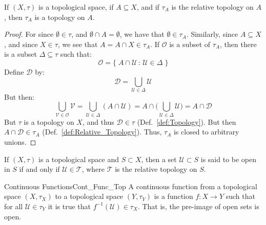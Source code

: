    \begin{theorem}
        If $(X,\tau)$ is a topological space, if $A\subseteq{X}$, and if
        $\tau_{A}$ is the relative topology on $A$, then $\tau_{A}$ is a
        topology on $A$.
    \end{theorem}
    \begin{proof}
        For since $\emptyset\in\tau$, and $\emptyset\cap{A}=\emptyset$, we have
        that $\emptyset\in\tau_{A}$. Similarly, since $A\subseteq{X}$, and
        since $X\in\tau$, we see that $A=A\cap{X}\in\tau_{A}$. If $\mathcal{O}$
        is a subset of $\tau_{A}$, then there is a subset $\Delta\subseteq\tau$
        such that:
        \begin{equation}
            \mathcal{O}=\big\{\;A\cap\mathcal{U}\,:\,\mathcal{U}\in\Delta\;\}
        \end{equation}
        Define $\mathcal{D}$ by:
        \begin{equation}
            \mathcal{D}=\bigcup_{\mathcal{U}\in\Delta}\mathcal{U}
        \end{equation}
        But then:
        \begin{equation}
            \bigcup_{\mathcal{V}\in\mathcal{O}}\mathcal{V}
            =\bigcup_{\mathcal{U}\in\Delta}(A\cap\mathcal{U})
            =A\cap\Big(\bigcup_{\mathcal{U}\in\Delta}\mathcal{U}\Big)
            =A\cap\mathcal{D}
        \end{equation}
        But $\tau$ is a topology on $X$, and thus $\mathcal{D}\in\tau$
        (Def.~\ref{def:Topology}). But then $A\cap\mathcal{D}\in\tau_{A}$
        (Def.~\ref{def:Relative_Topology}). Thus, $\tau_{A}$
        is closed to arbitrary unions.
    \end{proof}
    \begin{definition}
        If $(X,\tau)$ is a topological space and $S\subset{X}$, then a set
        $\mathcal{U}\subset S$ is said to be open in $S$ if and only if
        $\mathcal{U}\in \mathscr{T}$, where $\mathscr{T}$ is the relative
        topology on $S$.
    \end{definition}
    \begin{fdefinition}{Continuous Functions}{Cont_Func_Top}
        A continuous function from a
        topological space $(X,\tau_{X})$ to a topological space $(Y,\tau_{Y})$
        is a function $f:X\rightarrow{Y}$ such that for all
        $\mathcal{U}\in\tau_{Y}$ it is true that
        $f^{\minus{1}}(\mathcal{U})\in\tau_{X}$. That is, the pre-image of open
        sets is open.
    \end{fdefinition}
